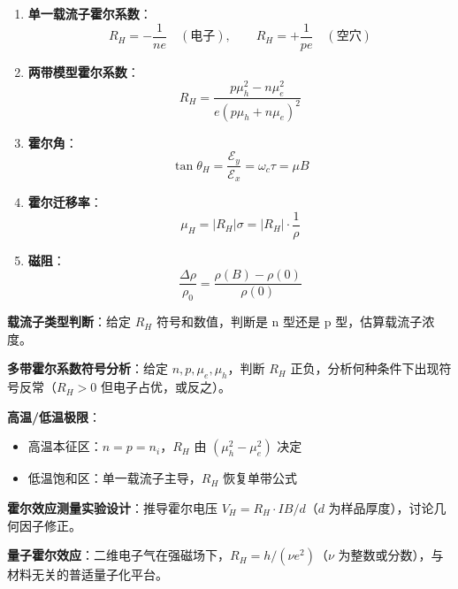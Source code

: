 \begin{formulabox}[核心公式]
\begin{enumerate}[label=\textbf{(\arabic*)}]
    \item \textbf{单一载流子霍尔系数}：
    \[
    R_H=-\frac{1}{ne}\quad(\text{电子}),\qquad R_H=+\frac{1}{pe}\quad(\text{空穴})
    \]

    \item \textbf{两带模型霍尔系数}：
    \[
    R_H=\frac{p\mu_h^2-n\mu_e^2}{e(p\mu_h+n\mu_e)^2}
    \]

    \item \textbf{霍尔角}：
    \[
    \tan\theta_H=\frac{\mathcal{E}_y}{\mathcal{E}_x}=\omega_c\tau=\mu B
    \]

    \item \textbf{霍尔迁移率}：
    \[
    \mu_H=|R_H|\sigma=|R_H|\cdot\frac{1}{\rho}
    \]

    \item \textbf{磁阻}：
    \[
    \frac{\Delta\rho}{\rho_0}=\frac{\rho(B)-\rho(0)}{\rho(0)}
    \]
\end{enumerate}
\end{formulabox}

\begin{drillbox}[训练点与考法变体]
 \textbf{载流子类型判断}：给定 $R_H$ 符号和数值，判断是 n 型还是 p 型，估算载流子浓度。

 \textbf{多带霍尔系数符号分析}：给定 $n, p, \mu_e, \mu_h$，判断 $R_H$ 正负，分析何种条件下出现符号反常（$R_H>0$ 但电子占优，或反之）。

 \textbf{高温/低温极限}：
\begin{itemize}[nosep]
    \item 高温本征区：$n=p=n_i$，$R_H$ 由 $(\mu_h^2-\mu_e^2)$ 决定
    \item 低温饱和区：单一载流子主导，$R_H$ 恢复单带公式
\end{itemize}

 \textbf{霍尔效应测量实验设计}：推导霍尔电压 $V_H=R_H\cdot IB/d$（$d$ 为样品厚度），讨论几何因子修正。

 \textbf{量子霍尔效应}：二维电子气在强磁场下，$R_H=h/(\nu e^2)$（$\nu$ 为整数或分数），与材料无关的普适量子化平台。
\end{drillbox}

